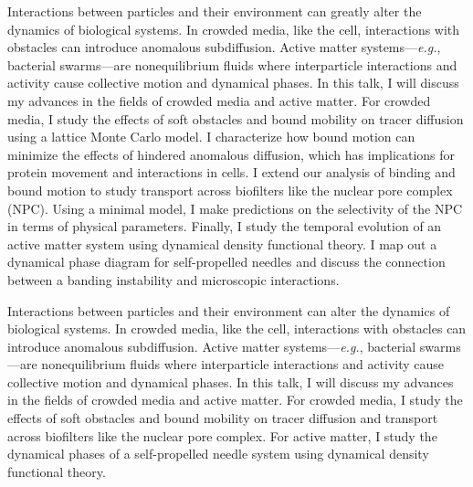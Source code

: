 Interactions between particles and their environment can greatly alter the
dynamics of biological systems. In crowded media, like the cell, interactions
with obstacles can introduce anomalous subdiffusion. Active matter
systems---\textit{e.g.}, bacterial swarms---are nonequilibrium fluids where
interparticle interactions and activity cause collective motion and dynamical
phases. In this talk, I will discuss my advances in the fields of crowded media
and active matter. For crowded media, I study the effects of soft obstacles and
bound mobility on tracer diffusion using a lattice Monte Carlo model. I
characterize how bound motion can minimize the effects of hindered anomalous
diffusion, which has implications for protein movement and interactions in
cells.  I extend our analysis of binding and bound motion to study transport
across biofilters like the nuclear pore complex (NPC). Using a minimal model, I
make predictions on the selectivity of the NPC in terms of physical parameters.
Finally, I study the temporal evolution of an active matter system using
dynamical density functional theory.  I map out a dynamical phase diagram for
self-propelled needles and discuss the connection between a banding instability
and microscopic interactions.


Interactions between particles and their environment can alter the dynamics of
biological systems. In crowded media, like the cell, interactions with obstacles
can introduce anomalous subdiffusion. Active matter systems---\textit{e.g.},
bacterial swarms---are nonequilibrium fluids where interparticle
interactions and activity cause collective motion and dynamical phases. In
this talk, I will discuss my advances in the fields of crowded media and
active matter. For crowded media, I study the effects of soft obstacles and
bound mobility on tracer diffusion and transport across biofilters like the
nuclear pore complex. For active matter, I study the dynamical phases of a
self-propelled needle system using dynamical density functional theory.
